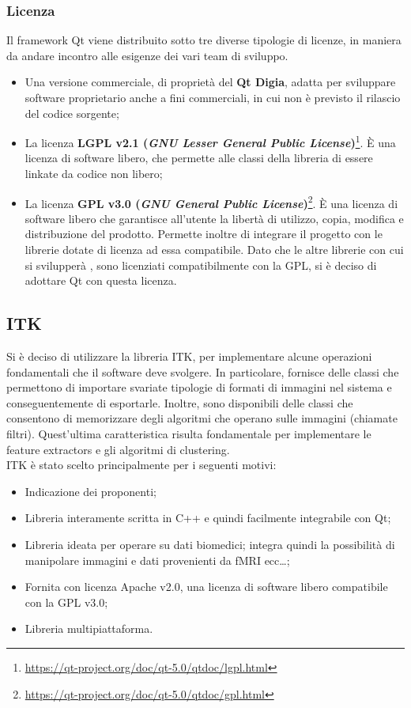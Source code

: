 	\subsubsection{Licenza}
	\label{licenza}
		Il framework\g{} Qt\glossario{} viene distribuito sotto tre diverse tipologie di licenze, in maniera da andare incontro alle esigenze dei vari team di sviluppo.
		\begin{itemize}
		\item Una versione commerciale, di proprietà del \textbf{Qt Digia}, adatta per sviluppare software proprietario anche a fini commerciali, in cui non è previsto il rilascio del codice sorgente;
		\item La licenza \textbf{LGPL v2.1 (\textit{GNU Lesser General Public License})}\footnote{\url{https://qt-project.org/doc/qt-5.0/qtdoc/lgpl.html}}. \`E una licenza di software libero, che permette alle classi della libreria di essere linkate da codice non libero;
		\item La licenza \textbf{GPL v3.0 (\textit{GNU General Public License})}\footnote{\url{https://qt-project.org/doc/qt-5.0/qtdoc/gpl.html}}. \`E una licenza di software libero che garantisce all'utente la libertà di utilizzo, copia, modifica e distribuzione del prodotto. Permette inoltre di integrare il progetto con le librerie dotate di licenza ad essa compatibile. Dato che le altre librerie con cui si svilupperà \project{}, sono licenziati compatibilmente con la GPL, si è deciso di adottare Qt\glossario{} con questa licenza.
	\end{itemize}
	
	\subsection{ITK}
	\label{itk}
		Si è deciso di utilizzare la libreria ITK\glossario{}, per implementare alcune operazioni fondamentali che il software deve svolgere. In particolare, fornisce delle classi che permettono di importare svariate tipologie di formati di immagini nel sistema e conseguentemente di esportarle. Inoltre, sono disponibili delle classi che consentono di memorizzare degli algoritmi che operano sulle immagini (chiamate filtri). Quest'ultima caratteristica risulta fondamentale per implementare le feature extractors\glossario{} e gli algoritmi di clustering\glossario{}.\\
		ITK\glossario{} è stato scelto principalmente per i seguenti motivi:
		\begin{itemize}
		\item Indicazione dei proponenti;
		\item Libreria interamente scritta in C++ e quindi facilmente integrabile con Qt\glossario{};
		\item Libreria ideata per operare su dati biomedici; integra quindi la possibilità di manipolare immagini e dati provenienti da fMRI\glossario{} ecc\dots{};
		\item Fornita con licenza Apache v2.0, una licenza di software libero compatibile con la GPL v3.0;
		\item Libreria multipiattaforma.
	\end{itemize}
	
